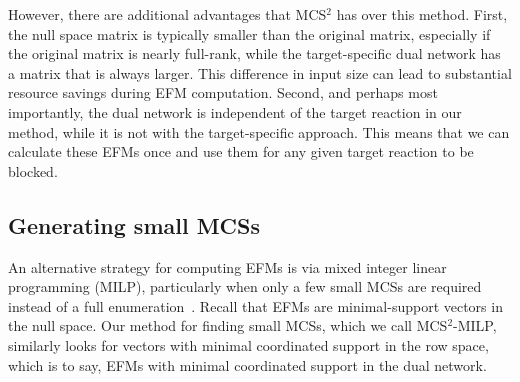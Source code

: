 \documentclass{bioinfo}
\theoremstyle{plain}
\theoremstyle{definition}
\begin{document}
However, there are additional advantages that MCS$^2$ has over this method. First, the null space matrix is typically smaller than the original matrix, especially if the original matrix is nearly full-rank, while the target-specific dual network has a matrix that is always larger. This difference in input size can lead to substantial resource savings during EFM computation. Second, and perhaps most importantly, the dual network is independent of the target reaction in our method, while it is not with the target-specific approach. This means that we can calculate these EFMs once and use them for any given target reaction to be blocked.

\subsection{Generating small MCSs}
An alternative strategy for computing EFMs is via mixed integer linear programming (MILP), particularly when only a few small MCSs are required instead of a full enumeration~\cite{ MILP-app1, MILP-app2}. Recall that EFMs are minimal-support vectors in the null space. Our method for finding small MCSs, which we call MCS$^2$-MILP, similarly looks for vectors with minimal coordinated support in the row space, which is to say, EFMs with minimal coordinated support in the dual network.
\end{document}

